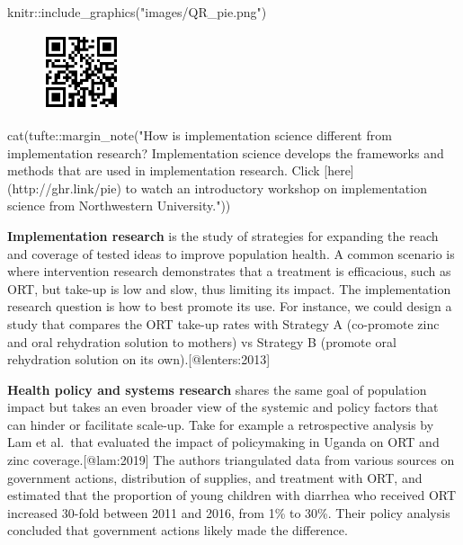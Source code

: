 \documentclass[
  letterpaper,
  DIV=11,
  numbers=noendperiod,
  oneside]{scrartcl}
\newenvironment{Shaded}{\begin{snugshade}}{\end{snugshade}}
\newcommand{\FunctionTok}[1]{\textcolor[rgb]{0.28,0.35,0.67}{#1}}
\newcommand{\NormalTok}[1]{\textcolor[rgb]{0.00,0.23,0.31}{#1}}
\newcommand{\SpecialCharTok}[1]{\textcolor[rgb]{0.37,0.37,0.37}{#1}}
\newcommand{\StringTok}[1]{\textcolor[rgb]{0.13,0.47,0.30}{#1}}
\begin{document}
\begin{Shaded}
\begin{Highlighting}[]
\NormalTok{knitr}\SpecialCharTok{::}\FunctionTok{include\_graphics}\NormalTok{(}\StringTok{"images/QR\_pie.png"}\NormalTok{)}
\end{Highlighting}
\end{Shaded}

\begin{figure}[H]

{\centering \includegraphics[width=0.2\textwidth,height=\textheight]{images/QR_pie.png}

}

\end{figure}

\begin{Shaded}
\begin{Highlighting}[]
\FunctionTok{cat}\NormalTok{(tufte}\SpecialCharTok{::}\FunctionTok{margin\_note}\NormalTok{(}\StringTok{"How is implementation science different from implementation research? Implementation science develops the frameworks and methods that are used in implementation research. Click [here](http://ghr.link/pie) to watch an introductory workshop on implementation science from Northwestern University."}\NormalTok{))}
\end{Highlighting}
\end{Shaded}

\textbf{Implementation research} is the study of strategies for
expanding the reach and coverage of tested ideas to improve population
health. A common scenario is where intervention research demonstrates
that a treatment is efficacious, such as ORT, but take-up is low and
slow, thus limiting its impact. The implementation research question is
how to best promote its use. For instance, we could design a study that
compares the ORT take-up rates with Strategy A (co-promote zinc and oral
rehydration solution to mothers) vs Strategy B (promote oral rehydration
solution on its own).{[}@lenters:2013{]}

\textbf{Health policy and systems research} shares the same goal of
population impact but takes an even broader view of the systemic and
policy factors that can hinder or facilitate scale-up. Take for example
a retrospective analysis by Lam et al.~that evaluated the impact of
policymaking in Uganda on ORT and zinc coverage.{[}@lam:2019{]} The
authors triangulated data from various sources on government actions,
distribution of supplies, and treatment with ORT, and estimated that the
proportion of young children with diarrhea who received ORT increased
30-fold between 2011 and 2016, from 1\% to 30\%. Their policy analysis
concluded that government actions likely made the difference.
\end{document}
